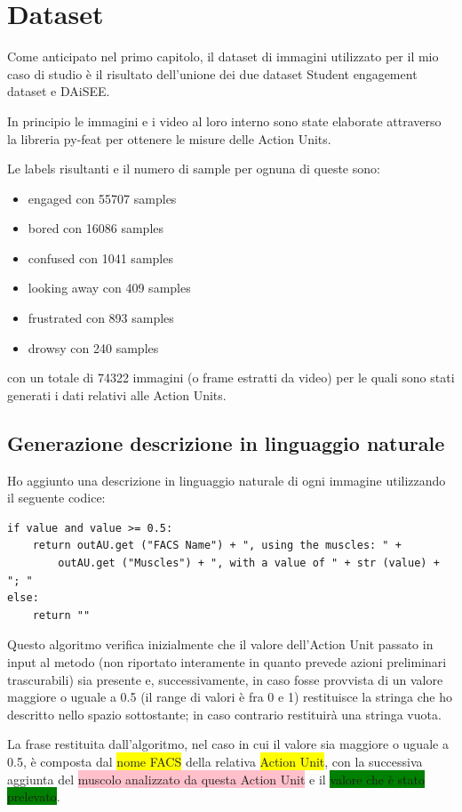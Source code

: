 \chapter{Dataset}
Come anticipato nel primo capitolo, il dataset di immagini utilizzato per il mio caso di studio è il risultato dell’unione dei due dataset Student engagement dataset\cite{StudEngagDataset} e DAiSEE\cite{DAiSEE}.

In principio le immagini e i video al loro interno sono state elaborate attraverso la libreria py-feat per ottenere le misure delle Action Units.

Le labels risultanti e il numero di sample per ognuna di queste sono:
\begin{itemize}
\item engaged con 55707 samples
\item bored con 16086 samples
\item confused con 1041 samples
\item looking away con 409 samples
\item frustrated con 893 samples
\item drowsy con 240 samples
\end{itemize}

con un totale di 74322 immagini (o frame estratti da video) per le quali sono stati generati i dati relativi alle Action Units.

\section{Generazione descrizione in linguaggio naturale}
Ho aggiunto una descrizione in linguaggio naturale di ogni immagine utilizzando il seguente codice:

\begin{verbatim}
if value and value >= 0.5:
    return outAU.get ("FACS Name") + ", using the muscles: " + 
        outAU.get ("Muscles") + ", with a value of " + str (value) + "; "
else:
    return ""
\end{verbatim}
Questo algoritmo verifica inizialmente che il valore dell’Action Unit passato in input al metodo (non riportato interamente in quanto prevede azioni preliminari trascurabili) sia presente e, successivamente, in caso fosse provvista di un valore maggiore o uguale a 0.5 (il range di valori è fra 0 e 1) restituisce la stringa che ho descritto nello spazio sottostante; in caso contrario restituirà una stringa vuota.

La frase restituita dall’algoritmo, nel caso in cui il valore sia maggiore o uguale a 0.5, è composta dal \colorbox{yellow}{nome FACS} della relativa \colorbox{yellow}{Action Unit}, con la successiva aggiunta del \colorbox{pink}{muscolo analizzato da questa Action Unit} e il \colorbox{green}{valore che è stato prelevato}.

